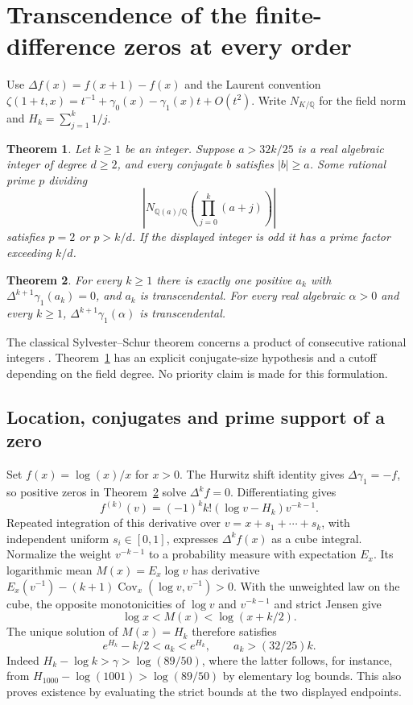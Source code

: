\documentclass[11pt,a4paper]{article}
\newtheorem{theorem}{Theorem}[section]
\theoremstyle{definition}\newtheorem{definition}[theorem]{Definition}\newtheorem{example}[theorem]{Example}
\theoremstyle{remark}\newtheorem{remark}[theorem]{Remark}
\newcommand{\Q}{\mathbb Q}\newcommand{\Z}{\mathbb Z}\newcommand{\R}{\mathbb R}\newcommand{\N}{\mathbb N}
\begin{document}
\section{Transcendence of the finite-difference zeros at every order}\label{sec:rev-all}
Use $\Delta f(x)=f(x+1)-f(x)$ and the Laurent convention
$\zeta(1+t,x)=t^{-1}+\gamma_0(x)-\gamma_1(x)t+O(t^2)$.
Write $N_{K/\Q}$ for the field norm and $H_k=\sum_{j=1}^k1/j$.
\begin{theorem}\label{th:prime}
Let $k\ge1$ be an integer. Suppose $a>32k/25$ is a real algebraic integer of degree $d\ge2$, and every conjugate $b$ satisfies $|b|\ge a$.
Some rational prime $p$ dividing
\[
 \left|N_{\Q(a)/\Q}\!\left(\prod_{j=0}^{k}(a+j)\right)\right|
\]
satisfies $p=2$ or $p>k/d$. If the displayed integer is odd it has a prime factor exceeding $k/d$.
\end{theorem}
\begin{theorem}\label{th:zero}
For every $k\ge1$ there is exactly one positive $a_k$ with $\Delta^{k+1}\gamma_1(a_k)=0$, and $a_k$ is transcendental. For every real algebraic $\alpha>0$ and every $k\ge1$, $\Delta^{k+1}\gamma_1(\alpha)$ is transcendental.
\end{theorem}
The classical Sylvester--Schur theorem concerns a product of consecutive rational integers \cite{Erdos}. Theorem~\ref{th:prime} has an explicit conjugate-size hypothesis and a cutoff depending on the field degree. No priority claim is made for this formulation.
\subsection{Location, conjugates and prime support of a zero}
Set $f(x)=\log(x)/x$ for $x>0$. The Hurwitz shift identity gives $\Delta\gamma_1=-f$, so positive zeros in Theorem~\ref{th:zero} solve $\Delta^k f=0$. Differentiating gives
\[
 f^{(k)}(v)=(-1)^k k!(\log v-H_k)v^{-k-1}.
\]
Repeated integration of this derivative over $v=x+s_1+\cdots+s_k$, with independent uniform $s_i\in[0,1]$, expresses $\Delta^k f(x)$ as a cube integral. Normalize the weight $v^{-k-1}$ to a probability measure with expectation $E_x$. Its logarithmic mean $M(x)=E_x\log v$ has derivative $E_x(v^{-1})-(k+1)\operatorname{Cov}_x(\log v,v^{-1})>0$. With the unweighted law on the cube, the opposite monotonicities of $\log v$ and $v^{-k-1}$ and strict Jensen give
\[
 \log x < M(x) < \log(x+k/2).
\]
The unique solution of $M(x)=H_k$ therefore satisfies
\[
 e^{H_k}-k/2<a_k<e^{H_k},\qquad a_k>(32/25)k .
\]
Indeed $H_k-\log k>\gamma>\log(89/50)$, where the latter follows, for instance, from $H_{1000}-\log(1001)>\log(89/50)$ by elementary log bounds. This also proves existence by evaluating the strict bounds at the two displayed endpoints.
\end{document}
